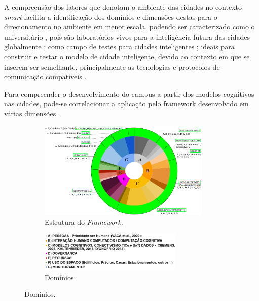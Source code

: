 \documentclass[portuguese]{textolivre}
\begin{document}
A compreensão dos fatores que denotam o ambiente das cidades no contexto \textit{smart} facilita a identificação dos domínios e dimensões destas para o direcionamento no ambiente em menor escala, podendo ser caracterizado como o universitário \cite{ramlee2019, alrashed2020}, pois são laboratórios vivos para a inteligência futura das cidades globalmente \cite{omotayo2021}; como campo de testes para cidades inteligentes \cite{mohammadi2021}; ideais para construir e testar o modelo de cidade inteligente, devido ao contexto em que se inserem ser semelhante, principalmente as tecnologias e protocolos de comunicação compatíveis \cite{alrashed2020}. 

Para compreender o desenvolvimento do campus a partir dos modelos cognitivos nas cidades, pode-se correlacionar a aplicação pelo framework desenvolvido em várias dimensões \cite{giuriatti2024}.

\begin{figure}[h!]
    \centering

    \begin{subfigure}[b]{\textwidth}
        \centering
        \includegraphics[width=0.9\textwidth,keepaspectratio]{images/FIGURA1_A.png}
        \caption{Estrutura do \textit{Framework}.}
        
    \end{subfigure}

    \vspace{0.5cm}

    \begin{subfigure}[b]{\textwidth}
        \centering
        \includegraphics[width=0.75\textwidth,keepaspectratio]{images/FIGURA1_B.png}
        \caption{Domínios.}
        
    \end{subfigure}

\end{figure}
\end{document}
